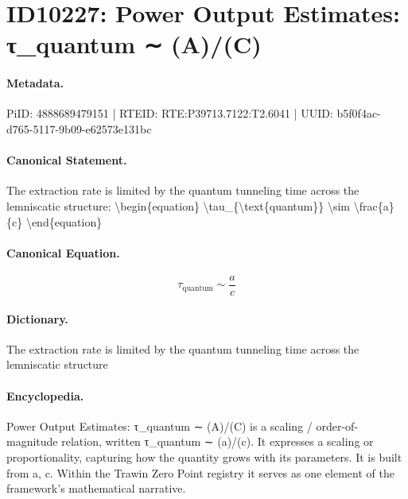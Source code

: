 \section*{ID10227: Power Output Estimates: τ\_quantum ∼ (A)/(C)}
\paragraph{Metadata.}
PiID: 4888689479151 | RTEID: RTE:P39713.7122:T2.6041 | UUID: b5f0f4ac-d765-5117-9b09-e62573e131bc

\paragraph{Canonical Statement.}
The extraction rate is limited by the quantum tunneling time across the lemniscatic structure: \textbackslash{}begin\{equation\} \textbackslash{}tau\_\{\textbackslash{}text\{quantum\}\} \textbackslash{}sim \textbackslash{}frac\{a\}\{c\} \textbackslash{}end\{equation\}

\paragraph{Canonical Equation.}
\[
\tau_{\text{quantum}} \sim \frac{a}{c}
\]

\paragraph{Dictionary.}
The extraction rate is limited by the quantum tunneling time across the lemniscatic structure

\paragraph{Encyclopedia.}
Power Output Estimates: τ\_quantum ∼ (A)/(C) is a scaling / order-of-magnitude relation, written τ\_quantum ∼ (a)/(c). It expresses a scaling or proportionality, capturing how the quantity grows with its parameters. It is built from a, c. Within the Trawin Zero Point registry it serves as one element of the framework's mathematical narrative.
